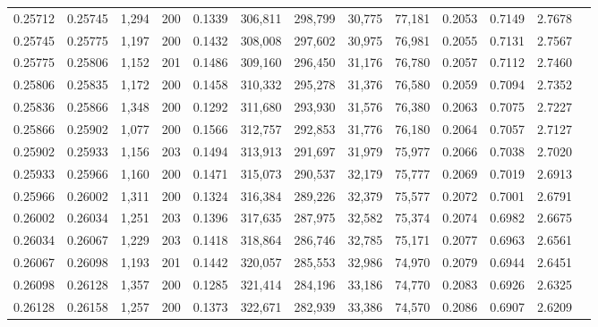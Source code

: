 \begin{tabular}{rrrrrrrrrrrrr}
0.25712 & 0.25745 & 1,294 & 200 &                                     0.1339 & 306,811 & 298,799 &  30,775 &  77,181 & 0.2053 & 0.7149 & 2.7678 \\
0.25745 & 0.25775 & 1,197 & 200 &                                     0.1432 & 308,008 & 297,602 &  30,975 &  76,981 & 0.2055 & 0.7131 & 2.7567 \\
0.25775 & 0.25806 & 1,152 & 201 &                                     0.1486 & 309,160 & 296,450 &  31,176 &  76,780 & 0.2057 & 0.7112 & 2.7460 \\
0.25806 & 0.25835 & 1,172 & 200 &                                     0.1458 & 310,332 & 295,278 &  31,376 &  76,580 & 0.2059 & 0.7094 & 2.7352 \\
0.25836 & 0.25866 & 1,348 & 200 &                                     0.1292 & 311,680 & 293,930 &  31,576 &  76,380 & 0.2063 & 0.7075 & 2.7227 \\
0.25866 & 0.25902 & 1,077 & 200 &                                     0.1566 & 312,757 & 292,853 &  31,776 &  76,180 & 0.2064 & 0.7057 & 2.7127 \\
0.25902 & 0.25933 & 1,156 & 203 &                                     0.1494 & 313,913 & 291,697 &  31,979 &  75,977 & 0.2066 & 0.7038 & 2.7020 \\
0.25933 & 0.25966 & 1,160 & 200 &                                     0.1471 & 315,073 & 290,537 &  32,179 &  75,777 & 0.2069 & 0.7019 & 2.6913 \\
0.25966 & 0.26002 & 1,311 & 200 &                                     0.1324 & 316,384 & 289,226 &  32,379 &  75,577 & 0.2072 & 0.7001 & 2.6791 \\
0.26002 & 0.26034 & 1,251 & 203 &                                     0.1396 & 317,635 & 287,975 &  32,582 &  75,374 & 0.2074 & 0.6982 & 2.6675 \\
0.26034 & 0.26067 & 1,229 & 203 &                                     0.1418 & 318,864 & 286,746 &  32,785 &  75,171 & 0.2077 & 0.6963 & 2.6561 \\
0.26067 & 0.26098 & 1,193 & 201 &                                     0.1442 & 320,057 & 285,553 &  32,986 &  74,970 & 0.2079 & 0.6944 & 2.6451 \\
0.26098 & 0.26128 & 1,357 & 200 &                                     0.1285 & 321,414 & 284,196 &  33,186 &  74,770 & 0.2083 & 0.6926 & 2.6325 \\
0.26128 & 0.26158 & 1,257 & 200 &                                     0.1373 & 322,671 & 282,939 &  33,386 &  74,570 & 0.2086 & 0.6907 & 2.6209 \\

\end{tabular}

